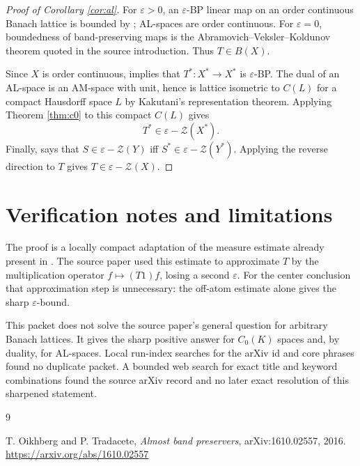 \documentclass[11pt]{article}
\newcommand{\eps}{\varepsilon}
\newcommand{\Z}{\mathcal Z}
\begin{document}
\begin{proof}[Proof of Corollary \ref{cor:al}]
For \(\eps>0\), an \(\eps\)-BP linear map on an order continuous Banach
lattice is bounded by \cite[Corollary 3.8]{OT}; AL-spaces are order
continuous. For \(\eps=0\), boundedness of band-preserving maps is the
Abramovich--Veksler--Koldunov theorem quoted in the source introduction.
Thus \(T\in B(X)\).

Since \(X\) is order continuous, \cite[Proposition 2.11]{OT} implies that
\(T^*:X^*\to X^*\) is \(\eps\)-BP. The dual of an AL-space is an AM-space
with unit, hence is lattice isometric to \(C(L)\) for a compact Hausdorff
space \(L\) by Kakutani's representation theorem. Applying Theorem
\ref{thm:c0} to this compact \(C(L)\) gives
\[
 T^*\in \eps-\Z(X^*).
\]
Finally, \cite[Proposition 4.3]{OT} says that \(S\in\eps-\Z(Y)\) iff
\(S^*\in\eps-\Z(Y^*)\). Applying the reverse direction to \(T\) gives
\(T\in\eps-\Z(X)\).
\end{proof}

\section*{Verification notes and limitations}

The proof is a locally compact adaptation of the measure estimate already
present in \cite[Theorem 6.2]{OT}. The source paper used this estimate to
approximate \(T\) by the multiplication operator \(f\mapsto (T1)f\), losing a
second \(\eps\). For the center conclusion that approximation step is
unnecessary: the off-atom estimate alone gives the sharp \(\eps\)-bound.

This packet does not solve the source paper's general question for arbitrary
Banach lattices. It gives the sharp positive answer for \(C_0(K)\) spaces and,
by duality, for AL-spaces. Local run-index searches for the arXiv id and core
phrases found no duplicate packet. A bounded web search for exact title and
keyword combinations found the source arXiv record and no later exact
resolution of this sharpened statement.

\begin{thebibliography}{9}

T. Oikhberg and P. Tradacete,
\emph{Almost band preservers},
arXiv:1610.02557, 2016.
\url{https://arxiv.org/abs/1610.02557}

\end{thebibliography}
\end{document}
